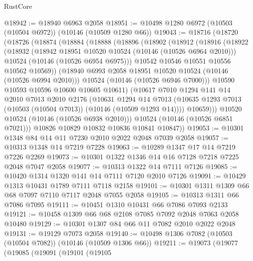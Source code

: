 \begin{lexlean}{RustCore}
\begin{coremodule}
@18942 := @18940 @6963 @2058
@18951 := @10498 @1280 @6972 (@10503 (@10504 @6972)) (@10146 (@10509 @1280 @66))
@19043 := @18716
    (@18720
      (@18726
        (@18874
          (@18884
            (@18888
              (@18896
                (@18902
                  (@18912
                    (@18916
                      (@18922
                        (@18932
                          (@18942 @18951 @10520 @10524 (@10146 (@10526 @6964 @2010)))
                          @10524
                          (@10146 (@10526 @6954 @6975)))
                        @10542
                        @10546
                        @10551
                        @10556
                        @10562
                        @10569))
                    (@18940 @6993 @2058 @18951 @10520 @10524 (@10146 (@10526 @6994 @2010)))
                    @10524
                    (@10146 (@10526 @6946 @7000)))
                  @10590
                  @10593
                  @10596
                  @10600
                  @10605
                  @10611)
                (@10617
                  @7010
                  @1294
                  @141
                  @14
                  @2010
                  @7013
                  @2010
                  @2176
                  (@10631
                    @1294
                    @14
                    @7013
                    (@10635 @1293 @7013 (@10503 (@10504 @7013)) (@10146 (@10509 @1293 @14))))
                  @10659)))
            @10520
            @10524
            (@10146 (@10526 @6938 @2010)))
          @10524
          (@10146 (@10526 @6851 @7021)))
        @10826
        @10829
        @10832
        @10836
        @10841
        @10847))
@19053 := @10301 @1348 @84 @14 @11 @7230 @2010 @2022 @2048 @7039 @2058
@19057 := @10313 @1348 @14 @7219 @7228
@19063 := @10289 @1347 @17 @14 @7219 @7226 @2269
@19073 := @10301 @1322 @1346 @14 @16 @7128 @7218 @7225 @2048 @7047 @2058
@19077 := @10313 @1322 @14 @7111 @7126
@19085 := @10420 @1314 @1320 @141 @14 @7111 @7120 @2010 @7126
@19091 := @10429 @1313 @10431 @1789 @7111 @7118 @2158
@19101 := @10301 @1311 @1309 @66 @68 @7097 @7110 @7117 @2048 @7055 @2058
@19105 := @10313 @1311 @66 @7086 @7095
@19111 := @10451 @1310 @10431 @66 @7086 @7093 @2133
@19121 := @10458 @1309 @66 @68 @2108 @7085 @7092 @2048 @7063 @2058 @10480
@19129 := @10301 @1307 @84 @66 @11 @7082 @2010 @2022 @2048
@19131 := @19129 @7073 @2058
@19140 := @10498 @1306 @7082 (@10503 (@10504 @7082)) (@10146 (@10509 @1306 @66))
@19211 := @19073
    (@19077
      (@19085
        (@19091
          (@19101
            (@19105

\end{coremodule}
\end{lexlean}
